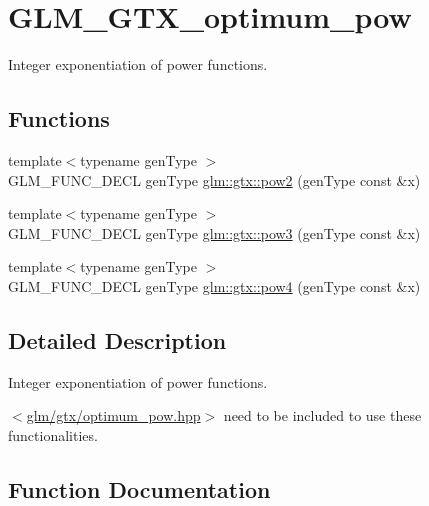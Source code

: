 \hypertarget{group__gtx__optimum__pow}{}\section{G\+L\+M\+\_\+\+G\+T\+X\+\_\+optimum\+\_\+pow}
\label{group__gtx__optimum__pow}


Integer exponentiation of power functions.  


\subsection*{Functions}
\begin{DoxyCompactItemize}
\item 
{\footnotesize template$<$typename gen\+Type $>$ }\\G\+L\+M\+\_\+\+F\+U\+N\+C\+\_\+\+D\+E\+CL gen\+Type \hyperlink{group__gtx__optimum__pow_ga19aaff3213bf23bdec3ef124ace237e9}{glm\+::gtx\+::pow2} (gen\+Type const \&x)
\item 
{\footnotesize template$<$typename gen\+Type $>$ }\\G\+L\+M\+\_\+\+F\+U\+N\+C\+\_\+\+D\+E\+CL gen\+Type \hyperlink{group__gtx__optimum__pow_ga35689d03cd434d6ea819f1942d3bf82e}{glm\+::gtx\+::pow3} (gen\+Type const \&x)
\item 
{\footnotesize template$<$typename gen\+Type $>$ }\\G\+L\+M\+\_\+\+F\+U\+N\+C\+\_\+\+D\+E\+CL gen\+Type \hyperlink{group__gtx__optimum__pow_gacef0968763026e180e53e735007dbf5a}{glm\+::gtx\+::pow4} (gen\+Type const \&x)
\end{DoxyCompactItemize}


\subsection{Detailed Description}
Integer exponentiation of power functions. 

$<$\hyperlink{optimum__pow_8hpp}{glm/gtx/optimum\+\_\+pow.\+hpp}$>$ need to be included to use these functionalities. 

\subsection{Function Documentation}
\mbox{\label{group__gtx__optimum__pow_ga19aaff3213bf23bdec3ef124ace237e9}} 
